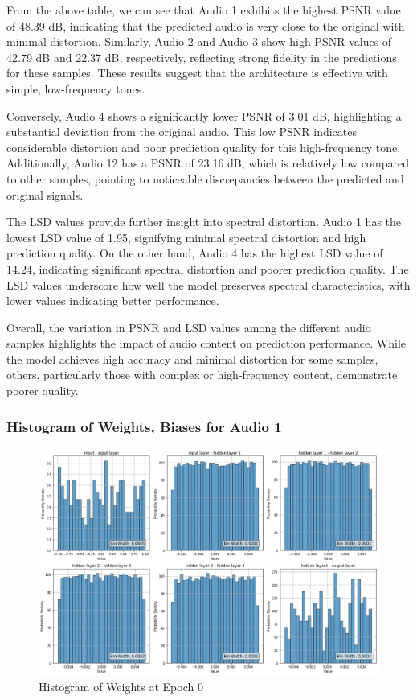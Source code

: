\documentclass{ioereport}
\begin{document}
From the above table, we can see that Audio 1 exhibits the highest PSNR value of 48.39 dB, indicating that the predicted audio is very close to the original with minimal distortion. Similarly, Audio 2 and Audio 3 show high PSNR values of 42.79 dB and 22.37 dB, respectively, reflecting strong fidelity in the predictions for these samples. These results suggest that the architecture is effective with simple, low-frequency tones.

Conversely, Audio 4 shows a significantly lower PSNR of 3.01 dB, highlighting a substantial deviation from the original audio. This low PSNR indicates considerable distortion and poor prediction quality for this high-frequency tone. Additionally, Audio 12 has a PSNR of 23.16 dB, which is relatively low compared to other samples, pointing to noticeable discrepancies between the predicted and original signals.

The LSD values provide further insight into spectral distortion. Audio 1 has the lowest LSD value of 1.95, signifying minimal spectral distortion and high prediction quality. On the other hand, Audio 4 has the highest LSD value of 14.24, indicating significant spectral distortion and poorer prediction quality. The LSD values underscore how well the model preserves spectral characteristics, with lower values indicating better performance.

Overall, the variation in PSNR and LSD values among the different audio samples highlights the impact of audio content on prediction performance. While the model achieves high accuracy and minimal distortion for some samples, others, particularly those with complex or high-frequency content, demonstrate poorer quality.


\subsubsection{Histogram of Weights, Biases for Audio 1}


    \begin{figure}[H]
        \centering
        \includegraphics[width=\linewidth]{assets/audio histogram/epoch0Weight.png}
        \caption{Histogram of Weights at Epoch 0}
        \label{fig:audio-weight-0}
    \end{figure}
\end{document}
